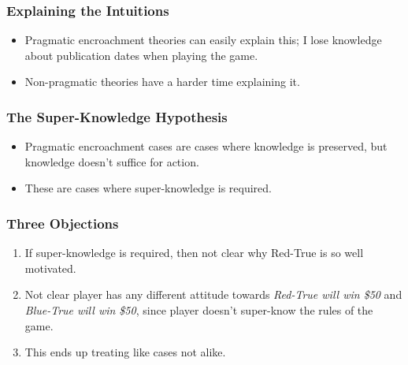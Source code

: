 \begin{frame}

\frametitle{Explaining the Intuitions}
\label{explainingtheintuitions}

\begin{itemize}
\item Pragmatic encroachment theories can easily explain this; I lose knowledge about publication dates when playing the game.

\item Non-pragmatic theories have a harder time explaining it.

\end{itemize}
\end{frame}

\begin{frame}

\frametitle{The Super-Knowledge Hypothesis}
\label{thesuper-knowledgehypothesis}

\begin{itemize}
\item Pragmatic encroachment cases are cases where knowledge is preserved, but knowledge doesn't suffice for action.

\item These are cases where super-knowledge is required.

\end{itemize}
\end{frame}

\begin{frame}

\frametitle{Three Objections}
\label{threeobjections}

\begin{enumerate}
\item If super-knowledge is required, then not clear why Red-True is so well motivated.\pause

\item Not clear player has any different attitude towards \emph{Red-True will win \$50} and \emph{Blue-True will win \$50}, since player doesn't super-know the rules of the game.\pause

\item This ends up treating like cases not alike.

\end{enumerate}
\end{frame}

